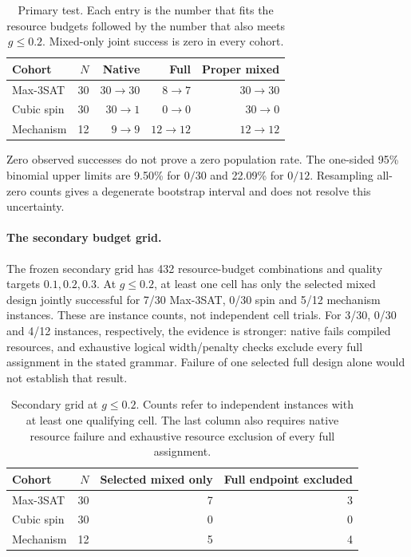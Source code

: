 \documentclass[a4paper,onecolumn,11pt,unpublished]{quantumarticle}
\theoremstyle{remark}
\begin{document}
\begin{table}[htbp]\centering\small
\caption{Primary test. Each entry is the number that fits the resource
budgets followed by the number that also meets $g\leq0.2$.
Mixed-only joint success is zero in every cohort.}
\label{tab:v3-primary}
\begin{tabular}{lrrrr}\toprule
Cohort & $N$ & Native & Full & Proper mixed\\\midrule
Max-3SAT & 30 & $30\to30$ & $8\to7$ & $30\to30$\\
Cubic spin & 30 & $30\to1$ & $0\to0$ & $30\to0$\\
Mechanism & 12 & $9\to9$ & $12\to12$ & $12\to12$\\\bottomrule
\end{tabular}\end{table}

Zero observed successes do not prove a zero population rate.
The one-sided 95\% binomial upper limits are 9.50\% for $0/30$ and
22.09\% for $0/12$. Resampling all-zero counts gives a degenerate
bootstrap interval and does not resolve this uncertainty.

\paragraph{The secondary budget grid.}
The frozen secondary grid has 432 resource-budget combinations and quality
targets $0.1,0.2,0.3$. At $g\leq0.2$, at least one cell has only the selected
mixed design jointly successful for 7/30 Max-3SAT, 0/30 spin and 5/12
mechanism instances. These are instance counts, not independent cell trials.
For 3/30, 0/30 and 4/12 instances, respectively, the evidence is stronger:
native fails compiled resources, and exhaustive logical width/penalty checks
exclude every full assignment in the stated grammar.
Failure of one selected full design alone would not establish that result.

\begin{table}[htbp]\centering\small
\caption{Secondary grid at $g\leq0.2$. Counts refer to independent instances
with at least one qualifying cell. The last column also requires native
resource failure and exhaustive resource exclusion of every full assignment.}
\label{tab:v3-secondary}
\begin{tabular}{lrrr}\toprule
Cohort & $N$ & Selected mixed only & Full endpoint excluded\\\midrule
Max-3SAT & 30 & 7 & 3\\
Cubic spin & 30 & 0 & 0\\
Mechanism & 12 & 5 & 4\\\bottomrule
\end{tabular}\end{table}
\end{document}

